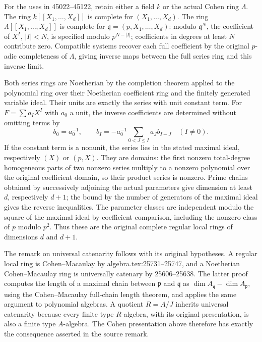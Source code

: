 For the uses in 45022--45122, retain either a field \(k\) or the actual Cohen ring \(\Lambda\). The ring \(k[[X_1,\ldots,X_d]]\) is complete for \((X_1,\ldots,X_d)\). The ring \(\Lambda[[X_1,\ldots,X_d]]\) is complete for \(\mathfrak q=(p,X_1,\ldots,X_d)\): modulo \(\mathfrak q^N\), the coefficient of \(X^I\), \(|I|<N\), is specified modulo \(p^{N-|I|}\); coefficients in degrees at least \(N\) contribute zero. Compatible systems recover each full coefficient by the original \(p\)-adic completeness of \(\Lambda\), giving inverse maps between the full series ring and this inverse limit.

Both series rings are Noetherian by the completion theorem applied to the polynomial ring over their Noetherian coefficient ring and the finitely generated variable ideal. Their units are exactly the series with unit constant term. For \(F=\sum a_IX^I\) with \(a_0\) a unit, the inverse coefficients are determined without omitting terms by \[
 b_0=a_0^{-1},\qquad
 b_I=-a_0^{-1}\sum_{0<J\leq I}a_Jb_{I-J}\quad(I\ne0).
\] If the constant term is a nonunit, the series lies in the stated maximal ideal, respectively \((X)\) or \((p,X)\). They are domains: the first nonzero total-degree homogeneous parts of two nonzero series multiply to a nonzero polynomial over the original coefficient domain, so their product series is nonzero. Prime chains obtained by successively adjoining the actual parameters give dimension at least \(d\), respectively \(d+1\); the bound by the number of generators of the maximal ideal gives the reverse inequalities. The parameter classes are independent modulo the square of the maximal ideal by coefficient comparison, including the nonzero class of \(p\) modulo \(p^2\). Thus these are the original complete regular local rings of dimensions \(d\) and \(d+1\).

The remark on universal catenarity follows with its original hypotheses. A regular local ring is Cohen--Macaulay by algebra.\AlgebraIdentifierBreak{}tex:\AlgebraIdentifierBreak{}25731--\AlgebraIdentifierBreak{}25747, and a Noetherian Cohen--Macaulay ring is universally catenary by 25606--25638. The latter proof computes the length of a maximal chain between \(\mathfrak p\) and \(\mathfrak q\) as \(\dim A_{\mathfrak q}-\dim A_{\mathfrak p}\), using the Cohen--Macaulay full-chain length theorem, and applies the same argument to polynomial algebras. A quotient \(R=A/J\) inherits universal catenarity because every finite type \(R\)-algebra, with its original presentation, is also a finite type \(A\)-algebra. The Cohen presentation above therefore has exactly the consequence asserted in the source remark.

